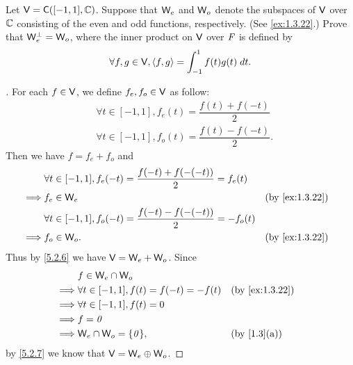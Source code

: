 \begin{ex}\label{ex:6.2.18}
  Let \(\V = \cfs([-1, 1], \C)\).
  Suppose that \(\mathsf{W}_e\) and \(\mathsf{W}_o\) denote the subspaces of \(\mathsf{V}\) over \(\mathbb{C}\) consisting of the even and odd functions, respectively.
  (See \cref{ex:1.3.22}.)
  Prove that \(\mathsf{W}_e^{\perp} = \mathsf{W}_o\), where the inner product on \(\mathsf{V}\) over \(\mathit{F}\) is defined by
  \[
    \forall f, g \in \mathsf{V}, \left\langle f, g\right\rangle = \int_{-1}^1 f(t) g(t) \; dt.
  \]
\end{ex}

\begin{proof}[]
  For each \(f \in \mathsf{V}\), we define \(f_e, f_o \in \mathsf{V}\) as follow:
  \begin{align*}
     & \forall t \in [-1, 1], f_e(t) = \dfrac{f(t) + f(-t)}{2}  \\
     & \forall t \in [-1, 1], f_o(t) = \dfrac{f(t) - f(-t)}{2}.
  \end{align*}
  Then we have \(f = f_e + f_o\) and
  \begin{align*}
             & \forall t \in [-1, 1], f_e(-t) = \dfrac{f(-t) + f(-(-t))}{2} = f_e(t)                      \\
    \implies & f_e \in \W_e                                                           &  & \by{ex:1.3.22} \\
             & \forall t \in [-1, 1], f_o(-t) = \dfrac{f(-t) - f(-(-t))}{2} = -f_o(t)                     \\
    \implies & f_o \in \W_o.                                                          &  & \by{ex:1.3.22}
  \end{align*}
  Thus by \cref{5.2.6} we have \(\mathsf{V} = \mathsf{W}_e + \mathsf{W}_o\).
  Since
  \begin{align*}
             & f \in \W_e \cap \W_o                                            \\
    \implies & \forall t \in [-1, 1], f(t) = f(-t) = -f(t) &  & \by{ex:1.3.22} \\
    \implies & \forall t \in [-1, 1], f(t) = 0                                 \\
    \implies & f = \zv                                                         \\
    \implies & \W_e \cap \W_o = \set{\zv},                 &  & \by{1.3}[a]
  \end{align*}
  by \cref{5.2.7} we know that \(\mathsf{V} = \mathsf{W}_e \oplus \mathsf{W}_o\).


\end{proof}

